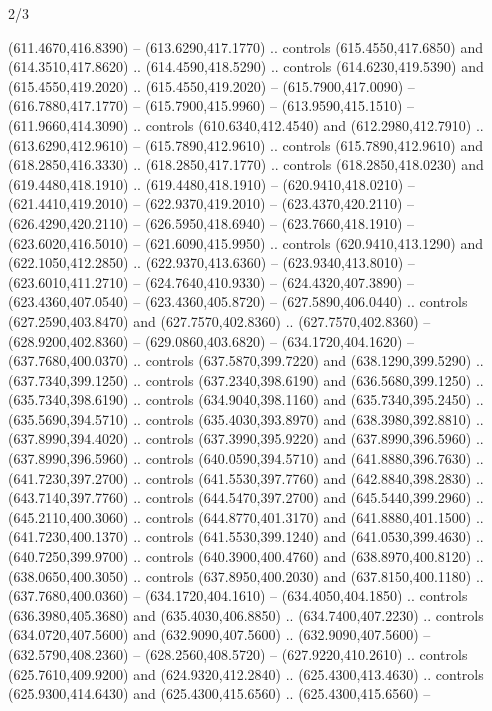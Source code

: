 \begin{flagdescription}{2/3}
\begin{scope}[xshift=0.5\flaglength,yshift=0.5\flagwidth,scale=\flagwidth/638.38]
\begin{scope}[y=0.80pt, x=0.80pt, yscale=-1,shift={(-600,-400)}]
\begin{scope}[shift={(-0.02,2.173)}]
  (611.4670,416.8390) -- (613.6290,417.1770) .. controls (615.4550,417.6850) and
  (614.3510,417.8620) .. (614.4590,418.5290) .. controls (614.6230,419.5390) and
  (615.4550,419.2020) .. (615.4550,419.2020) -- (615.7900,417.0090) --
  (616.7880,417.1770) -- (615.7900,415.9960) -- (613.9590,415.1510) --
  (611.9660,414.3090) .. controls (610.6340,412.4540) and (612.2980,412.7910) ..
  (613.6290,412.9610) -- (615.7890,412.9610) .. controls (615.7890,412.9610) and
  (618.2850,416.3330) .. (618.2850,417.1770) .. controls (618.2850,418.0230) and
  (619.4480,418.1910) .. (619.4480,418.1910) -- (620.9410,418.0210) --
  (621.4410,419.2010) -- (622.9370,419.2010) -- (623.4370,420.2110) --
  (626.4290,420.2110) -- (626.5950,418.6940) -- (623.7660,418.1910) --
  (623.6020,416.5010) -- (621.6090,415.9950) .. controls (620.9410,413.1290) and
  (622.1050,412.2850) .. (622.9370,413.6360) -- (623.9340,413.8010) --
  (623.6010,411.2710) -- (624.7640,410.9330) -- (624.4320,407.3890) --
  (623.4360,407.0540) -- (623.4360,405.8720) -- (627.5890,406.0440) .. controls
  (627.2590,403.8470) and (627.7570,402.8360) .. (627.7570,402.8360) --
  (628.9200,402.8360) -- (629.0860,403.6820) -- (634.1720,404.1620) --
  (637.7680,400.0370) .. controls (637.5870,399.7220) and (638.1290,399.5290) ..
  (637.7340,399.1250) .. controls (637.2340,398.6190) and (636.5680,399.1250) ..
  (635.7340,398.6190) .. controls (634.9040,398.1160) and (635.7340,395.2450) ..
  (635.5690,394.5710) .. controls (635.4030,393.8970) and (638.3980,392.8810) ..
  (637.8990,394.4020) .. controls (637.3990,395.9220) and (637.8990,396.5960) ..
  (637.8990,396.5960) .. controls (640.0590,394.5710) and (641.8880,396.7630) ..
  (641.7230,397.2700) .. controls (641.5530,397.7760) and (642.8840,398.2830) ..
  (643.7140,397.7760) .. controls (644.5470,397.2700) and (645.5440,399.2960) ..
  (645.2110,400.3060) .. controls (644.8770,401.3170) and (641.8880,401.1500) ..
  (641.7230,400.1370) .. controls (641.5530,399.1240) and (641.0530,399.4630) ..
  (640.7250,399.9700) .. controls (640.3900,400.4760) and (638.8970,400.8120) ..
  (638.0650,400.3050) .. controls (637.8950,400.2030) and (637.8150,400.1180) ..
  (637.7680,400.0360) -- (634.1720,404.1610) -- (634.4050,404.1850) .. controls
  (636.3980,405.3680) and (635.4030,406.8850) .. (634.7400,407.2230) .. controls
  (634.0720,407.5600) and (632.9090,407.5600) .. (632.9090,407.5600) --
  (632.5790,408.2360) -- (628.2560,408.5720) -- (627.9220,410.2610) .. controls
  (625.7610,409.9200) and (624.9320,412.2840) .. (625.4300,413.4630) .. controls
  (625.9300,414.6430) and (625.4300,415.6560) .. (625.4300,415.6560) --

\end{scope}
\end{scope}
\end{scope}
\end{flagdescription}
